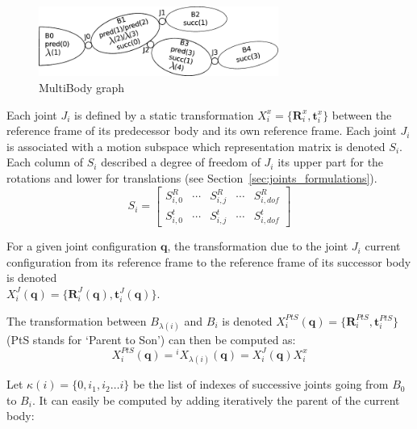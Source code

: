 \begin{figure}
  \centering
  \includegraphics[width=0.7\textwidth]{mbg.pdf}
  \caption{MultiBody graph}
\label{fig:mbg}
\end{figure}

Each joint $J_i$ is defined by a static transformation $X^x_i = \{\mathbf{R}^x_i, \mathbf{t}^x_i\}$ between the reference frame of its predecessor body and its own reference frame.
Each joint $J_i$ is associated with a motion subspace which representation matrix is denoted $S_i$.
Each column of $S_i$ described a degree of freedom of $J_i$ its upper part for the rotations and lower for translations (see Section~\ref{sec:joints_formulations}).
\begin{equation}
  S_i =
  \begin{bmatrix}
    S^R_{i,0} & \cdots &
    S^R_{i,j} & \cdots &
    S^R_{i,dof} \\
    S^t_{i,0} & \cdots &
    S^t_{i,j} & \cdots &
    S^t_{i,dof}
  \end{bmatrix}
\end{equation}

For a given joint configuration $\mathbf{q}$, the transformation due to the joint $J_i$ current configuration from its reference frame to the reference frame of its successor body is denoted \\$X^J_i (\mathbf{q}) = \{\mathbf{R}^J_i (\mathbf{q}), \mathbf{t}^J_i (\mathbf{q})\}$.

The transformation between $B_{\lambda(i)}$ and $B_i$ is denoted $X^{PtS}_i (\mathbf{q}) = \{\mathbf{R}^{PtS}_i, \mathbf{t}^{PtS}_i\}$ (PtS stands for `Parent to Son') can then be computed as:
\begin{equation}
  {X}^{PtS}_i (\mathbf{q}) = {}^{i}X_{\lambda (i)} (\mathbf{q}) = X^J_i (\mathbf{q}) X^x_i
  \label{eq:PtS}
\end{equation}

Let $\kappa (i) =\{0, i_1, i_2 \ldots i\}$ be the list of indexes of successive joints going from $B_0$ to $B_i$.
It can easily be computed by adding iteratively the parent of the current body:

